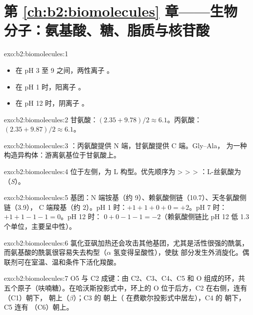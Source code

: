 \section*{第 \ref{ch:b2:biomolecules} 章——生物分子：氨基酸、糖、脂质与核苷酸}

\begin{solution}{exo:b2:biomolecules:1}
\begin{itemize}
  \item 在 pH 3 至 9 之间，两性离子 。
  \item 在 pH 1 时，阳离子 。
  \item 在 pH 12 时，阴离子 。
\end{itemize}
\end{solution}

\begin{solution}{exo:b2:biomolecules:2}
甘氨酸：$(2.35 + 9.78)/2 \approx 6.1$。丙氨酸：$(2.35 + 9.87)/2 \approx 6.1$。
\end{solution}

\begin{solution}{exo:b2:biomolecules:3}
：丙氨酸提供 N 端，甘氨酸提供 C 端。Gly--Ala，
为一种构造异构体：游离氨基位于甘氨酸上。
\end{solution}

\begin{solution}{exo:b2:biomolecules:4}
 位于左侧，为 L 构型。优先顺序为  >  >  > ：L-丝氨酸为
（\textit{S}）。
\end{solution}

\begin{solution}{exo:b2:biomolecules:5}
基团：N 端铵基（约 9）、赖氨酸侧链（10.7）、天冬氨酸侧链（3.9），
C 端羧基（约 2）。pH 1 时：$+1 +1 + 0 + 0 = +2$。pH 7 时：$+1 +1 -1 -1 = 0$。pH 12 时：
$0 + 0 - 1 - 1 = -2$（赖氨酸侧链比 pH 12 低 1.3 个单位，主要呈中性）。
\end{solution}

\begin{solution}{exo:b2:biomolecules:6}
氯化亚砜加热还会攻击其他基团，尤其是活性很强的酰氯，
而氨基酸的酰氯很容易失去构型（$\alpha$ 氢变得呈酸性），使肽
部分发生外消旋化。偶联剂可在室温、温和条件下活化羧酸。
\end{solution}

\begin{solution}{exo:b2:biomolecules:7}
O5 与 C2 成键：由 C2、C3、C4、C5 和 O 组成的环，共五个原子（呋喃糖）。在哈沃斯投影式中，环上的 O
位于后方，C2 在右侧，连有 （C1）朝下， 朝上（$\beta$）；C3 的  朝上（
在费歇尔投影式中居左），C4 的  朝下，C5 连有 （C6）朝上。
\end{solution}


